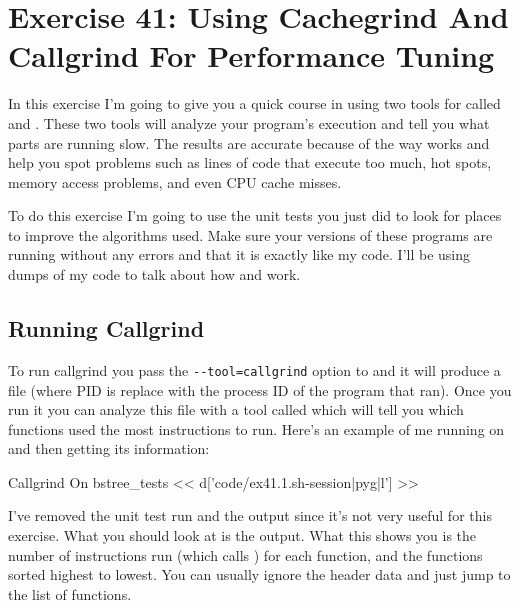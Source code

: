 \chapter{Exercise 41: Using Cachegrind And Callgrind For Performance Tuning}

In this exercise I'm going to give you a quick course in using two tools for 
called  and .  These two tools will analyze your program's
execution and tell you what parts are running slow.  The results are accurate because of the way  works
and help you spot problems such as lines of code that execute too much, hot spots, memory access problems,
and even CPU cache misses.

To do this exercise I'm going to use the  unit tests you just did
to look for places to improve the algorithms used.  Make sure your versions of these programs are running
without any  errors and that it is exactly like my code.  I'll be using
dumps of my code to talk about how  and  work.

\section{Running Callgrind}

To run callgrind you pass the \verb|--tool=callgrind| option to  and it will 
produce a  file (where PID is replace with the process ID of the program
that ran).   Once you run it you can analyze this  file with a tool 
called  which will tell you which functions used the most
instructions to run.  Here's an example of me running  on 
and then getting its information:

\begin{code}{Callgrind On bstree\_tests}
<< d['code/ex41.1.sh-session|pyg|l'] >>
\end{code}

I've removed the unit test run and the  output since it's not
very useful for this exercise.  What you should look at is the
 output.  What this shows you is the number of
instructions run (which  calls ) for each 
function, and the functions sorted highest to lowest.  You can usually ignore
the header data and just jump to the list of functions.

